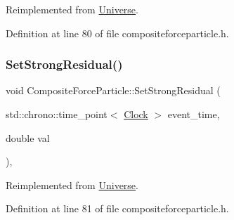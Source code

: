 Reimplemented from \hyperlink{class_universe_aafec97a231126b71c73ac1258609a284}{Universe}.



Definition at line 80 of file compositeforceparticle.\+h.

\mbox{\label{class_composite_force_particle_aeba1070d4ec6e52fd8276e38c6a6c2e1}} 
\subsubsection{\texorpdfstring{Set\+Strong\+Residual()}{SetStrongResidual()}}
{\footnotesize\ttfamily void Composite\+Force\+Particle\+::\+Set\+Strong\+Residual (\begin{DoxyParamCaption}\item[{std\+::chrono\+::time\+\_\+point$<$ \hyperlink{universe_8h_a0ef8d951d1ca5ab3cfaf7ab4c7a6fd80}{Clock} $>$}]{event\+\_\+time,  }\item[{double}]{val }\end{DoxyParamCaption})\hspace{0.3cm}{\ttfamily [inline]}, {\ttfamily [virtual]}}



Reimplemented from \hyperlink{class_universe_a1b2d6197ddf3d613cc30bd04d22ed8b7}{Universe}.



Definition at line 81 of file compositeforceparticle.\+h.

